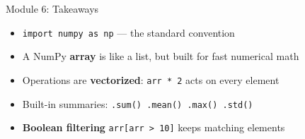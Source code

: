 \documentclass[aspectratio=169]{beamer}
\begin{document}
\begin{frame}{Module 6: Takeaways}
\vspace{0.3cm}
\begin{itemize}\setlength\itemsep{8pt}
  \item[\textcolor{wurgreen}{\faCheck}] \texttt{import numpy as np} --- the standard convention
  \item[\textcolor{wurgreen}{\faCheck}] A NumPy \textbf{array} is like a list, but built for fast numerical math
  \item[\textcolor{wurgreen}{\faCheck}] Operations are \textbf{vectorized}: \texttt{arr * 2} acts on every element
  \item[\textcolor{wurgreen}{\faCheck}] Built-in summaries: \texttt{.sum() .mean() .max() .std()}
  \item[\textcolor{wurgreen}{\faCheck}] \textbf{Boolean filtering} \texttt{arr[arr > 10]} keeps matching elements
\end{itemize}
\medskip
{}
\end{frame}
\end{document}
